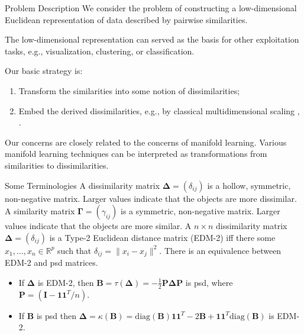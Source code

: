 \documentclass[professionalfonts, hyperref={pdfpagelabels=false,
  colorlinks=true, linkcolor=purple}]{beamer}
\begin{document}
\begin{frame}{Problem Description}
  We consider the problem of constructing a low-dimensional Euclidean
  representation of data described by pairwise similarities. 
  
 \vskip10pt The low-dimensional representation can served as the basis
 for other exploitation tasks, e.g., visualization, clustering, or 
 classification.  
 
 \vskip10pt Our basic strategy is:

  \begin{enumerate}
  \item Transform the similarities into some notion of dissimilarities;
  \item Embed the derived dissimilarities, e.g., by classical
    multidimensional scaling \cite{torgesen52:_multid},
    \cite{gower66:_some}.
  \end{enumerate}
  
  Our concerns are closely related to the concerns of \alert{manifold
    learning}. Various manifold learning techniques can be interpreted
  as transformations from similarities to dissimilarities.
\end{frame}
\begin{frame}{Some Terminologies}
  A \alert{dissimilarity matrix} $\bm{\Delta} = (\delta_{ij})$
  is a hollow, symmetric, non-negative matrix. Larger values indicate
  that the objects are more dissimilar.  
  \vskip10pt A \alert{similarity matrix} $\bm{\Gamma} =
  (\gamma_{ij})$ is a symmetric, non-negative matrix. Larger values
  indicate that the objects are more similar. 
  \vskip10pt A $n \times n$ dissimilarity matrix $\bm{\Delta} =
  (\delta_{ij})$ is a \alert{Type-2 Euclidean distance matrix}
  (EDM-2) iff there some $x_1,\dots, x_n \in
  \mathbb{R}^{p}$ such that $\delta_{ij} = \|x_i - x_j\|^{2}$.  
 \vskip10pt There is an equivalence between EDM-2 and psd matrices.
    \begin{itemize}
    \item If $\bm{\Delta}$ is EDM-2, then 
        $\mathbf{B} =
        \tau(\bm{\Delta}) = - \frac{1}{2} \mathbf{P} \bm{\Delta}
       \mathbf{P}$ is psd, where $\mathbf{P} = (\mathbf{I} - \bm{1}\bm{1}^{T}/n)$. 
 \item If $\bm{B}$ is psd then 
        $\bm{\Delta} =
        \kappa(\mathbf{B}) = \mathrm{diag}(\mathbf{B})\bm{1}\bm{1}^{T} -
        2\mathbf{B} + \bm{1}\bm{1}^{T}\mathrm{diag}(\mathbf{B})$       
      is EDM-2.
    \end{itemize}
\end{frame}
\end{document}
